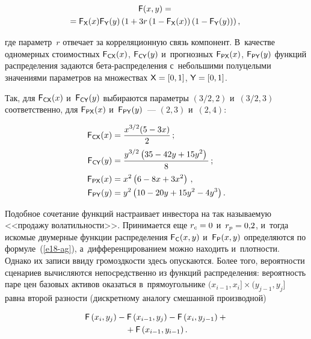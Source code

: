 \begin{multicols}{2}
\vspace*{-6pt}

\noindent
  \begin{multline}
  {\sf F}(x,y) = {}\\
  \!\!\! {}= {\sf F}_{\sf X}(x){\sf F}_{\sf Y}(y)\left( 1+3r\left(1-{\sf F}_{\sf 
X}(x)\right)\left( 1-{\sf F}_{\sf Y}(y)\right)\right),
  \label{e18-ag}
  \end{multline}
  
  \vspace*{-3pt}
  
  \noindent
где параметр~$r$ отвечает за корреляционную связь компонент. В~качестве одномерных стоимостных ${\sf F}_{\sf CX}(x)$, ${\sf F}_{\sf CY}(y)$ 
и~прогнозных ${\sf F}_{\sf PX}(x)$, ${\sf F}_{\sf PY}(y)$ функций распределения 
задаются бе\-та-рас\-пре\-де\-ле\-ния с~небольшими полуцелыми значениями 
параметров на множествах ${\sf X}\hm=  [0, 1]$, ${\sf Y}\hm = [0, 1]$. 
  
  Так, для ${\sf F}_{\sf CX}(x)$ и~${\sf F}_{\sf CY}(y)$ выбираются па\-ра\-мет\-ры 
$(3/2, 2)$ и~$(3/2, 3)$ соответственно, для ${\sf F}_{\sf PX}(x)$ и~${\sf F}_{\sf 
PY}(y)$~--- $(2, 3)$ и~$(2, 4)$:

\noindent
  \begin{align*}
  {\sf F}_{\sf CX}(x)&=\displaystyle\frac{\displaystyle x^{3/2}(5-3x)\mathstrut}{\displaystyle 2\mathstrut}\,;\\
   {\sf F}_{\sf CY} (y)&= 
\displaystyle\frac{\displaystyle y^{3/2}\left(35-42y+15y^2\right)\mathstrut}{\displaystyle 8\mathstrut}\,;
\\
  {\sf F}_{\sf PX}(x)&= x^2\left(6-8x+3x^2\right)\,,\\
   {\sf F}_{\sf PY}(y)&=y^2\left(10-20y+15y^2-4y^3\right).
  \end{align*}
  
  Подобное сочетание функций настраивает инвестора на так называемую 
<<продажу во\-ла\-тиль\-ности>>. Принимается еще $r_c\hm = 0$ 
и~$r_p \hm= 0{,}2$, и~тогда искомые двумерные функции распределения ${\sf F}_{\sf C}(x,y)$ 
и~${\sf F}_{\sf P}(x, y)$ определяются по формуле~(\ref{e18-ag}), 
а~дифференцированием можно находить и~плотности. Однако их записи ввиду 
громоздкости здесь опускаются. Более того, вероятности сценариев 
вычисляются непосредственно из функций распределения: вероятность паре 
цен базовых активов оказаться в~прямоугольнике  
$(x_{i-1}, x_i]\times(y_{j-1}, y_j]$ равна второй разности (дискретному аналогу 
смешанной производной)

\vspace*{-6pt}

\noindent
  \begin{multline}
  {\sf F}\left( x_i, y_j\right) -{\sf F}\left( x_{i-1},y_j\right) -{\sf F}\left(  
x_i,y_{j-1}\right) +{}\\
{}+{\sf F}\left( x_{i-1},y_{i-1}\right).
  \label{e19-ag}
  \end{multline}
  

\end{multicols}
